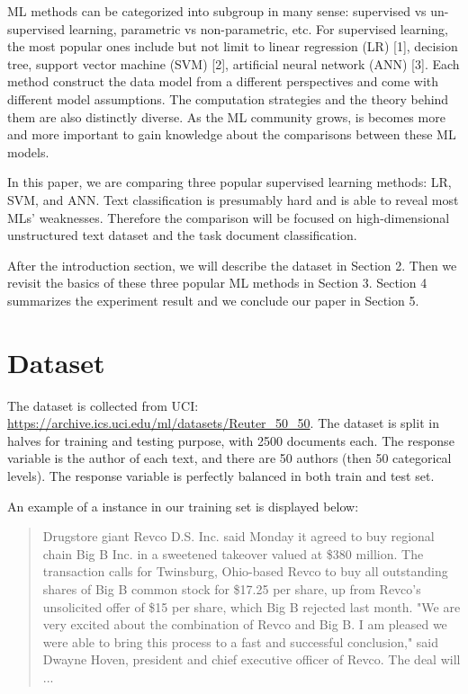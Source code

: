 \documentclass{article}
\begin{document}
ML methods can be categorized into subgroup in many sense: supervised vs un-supervised learning, parametric vs non-parametric, etc. For supervised learning, the most popular ones include but not limit to linear regression (LR) [1], decision tree, support vector machine (SVM) [2], artificial neural network (ANN) [3]. Each method construct the data model from a different perspectives and come with different model assumptions. The computation strategies and the theory behind them are also distinctly diverse. As the ML community grows, is becomes more and more important to gain knowledge about the comparisons between these ML models.

In this paper, we are comparing three popular supervised learning methods: LR, SVM, and ANN. Text classification is presumably hard and is able to reveal most MLs' weaknesses. Therefore the comparison will be focused on high-dimensional unstructured text dataset and the task document classification. %

After the introduction section, we will describe the dataset in Section 2. Then we revisit the basics of these three popular ML methods in Section 3. Section 4 summarizes the experiment result and we conclude our paper in Section 5. 

\section{Dataset}

The dataset is collected from UCI: \url{https://archive.ics.uci.edu/ml/datasets/Reuter_50_50}. The dataset is split in halves for training and testing purpose, with 2500 documents each. The response variable is the author of each text, and there are 50 authors (then 50 categorical levels). The response variable is perfectly balanced in both train and test set. 

\newpage

An example of a instance in our training set is displayed below:
\begin{quote}
Drugstore giant Revco D.S. Inc. said Monday it agreed to buy regional chain Big B Inc. in a sweetened takeover valued at \$380 million.
The transaction calls for Twinsburg, Ohio-based Revco to buy all outstanding shares of Big B common stock for \$17.25 per share, up from Revco's unsolicited offer of \$15 per share, which Big B rejected last month.
"We are very excited about the combination of Revco and Big B. I am pleased we were able to bring this process to a fast and successful conclusion," said Dwayne Hoven, president and chief executive officer of Revco.
The deal will ...
\end{quote}
\end{document}
